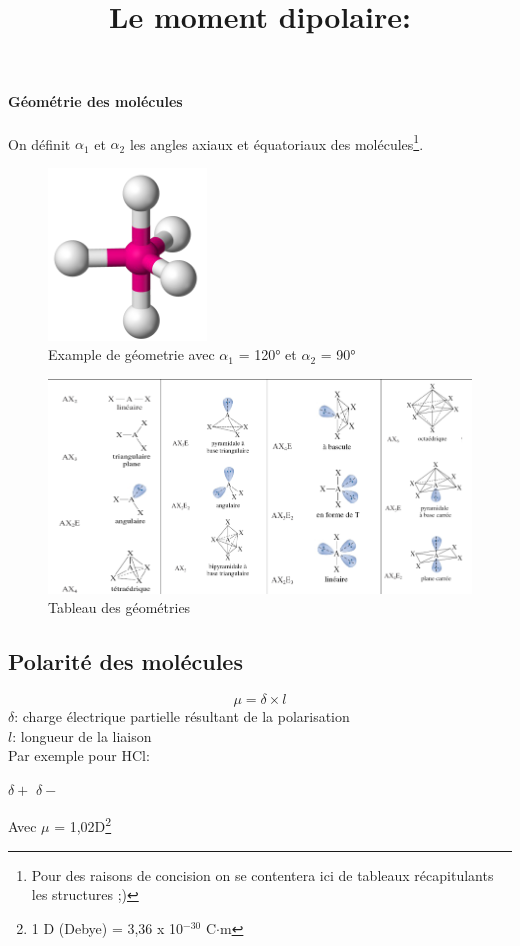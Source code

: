 \documentclass[10pt,a4paper]{book}
\begin{document}
\paragraph{Géométrie des molécules} On définit $\alpha_1$ et $\alpha_2$ les angles axiaux et équatoriaux des molécules\footnote{Pour des raisons de concision on se contentera ici de tableaux récapitulants les structures ;)}.
\begin{figure}[h!]
\begin{center}
\includegraphics[scale=0.75]{./assets/geometry_example.png}
\caption{Example de géometrie avec $\alpha_1$ = 120° et $\alpha_2$ = 90°}
\label{fig:geometry_ex}
\end{center}
\end{figure}
\begin{figure}[h!]
\begin{center}
\includegraphics[scale=0.65]{./assets/geometry_table.png}
\caption{Tableau des géométries}
\label{fig:geometry_table}
\end{center}
\end{figure}

\subsection{Polarité des molécules}

\title{Le moment dipolaire:}
\begin{displaymath}
\mu = \delta \times l
\end{displaymath}
$\delta$: charge électrique partielle résultant de la polarisation \\
$l$: longueur de la liaison\\
Par exemple pour HCl:\\
\begin{center}
$\delta+$ \; \; $\delta-$ \\
\end{center}
Avec $\mu$ = 1,02D\footnote{1 D (Debye) = 3,36 x 10$^{-30}$ C$\cdot$m}
\end{document}
